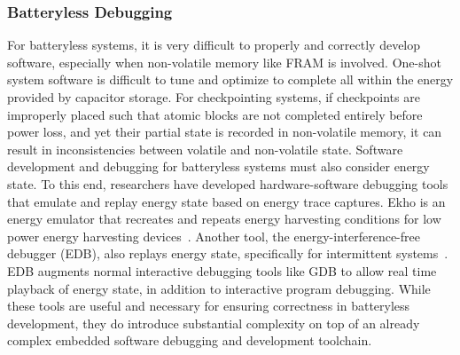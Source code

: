 \subsubsection{Batteryless Debugging}
For batteryless systems, it
is very difficult to properly and correctly develop software, especially when non-volatile memory like FRAM is involved.
One-shot system software is difficult to tune and optimize to complete all within the energy provided by capacitor storage.
For checkpointing systems, if checkpoints are improperly placed such that atomic blocks are not completed entirely before power loss, and yet their partial state is recorded in non-volatile memory,
it can result in inconsistencies between volatile and non-volatile state.
Software development and debugging for batteryless systems must also consider energy state.
To this end, researchers have developed hardware-software debugging tools that emulate and replay energy state based on energy trace captures.
Ekho is an energy emulator that recreates and repeats energy harvesting conditions for low power energy harvesting devices~\cite{hester2014ekho}.
Another tool, the energy-interference-free debugger (EDB), also replays energy state, specifically for intermittent systems~\cite{colin2016energy}.
EDB augments normal interactive debugging tools like GDB to allow real time playback of energy state, in addition to interactive program debugging.
While these tools are useful and necessary for ensuring correctness in batteryless development, they do introduce substantial complexity on top of an already complex embedded software debugging and development toolchain.

